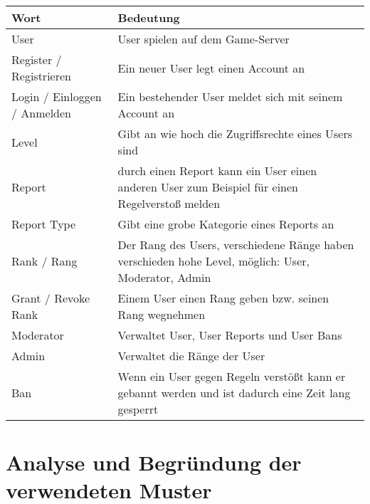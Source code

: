 \begin{center}
    \begin{tabular}{ | l | m{8cm} | }
        \hline
        Wort                         & Bedeutung                                                                                            \\ \hline
        User                         & User spielen auf dem Game-Server                                                                     \\ \hline
        Register / Registrieren      & Ein neuer User legt einen Account an                                                                 \\ \hline
        Login / Einloggen / Anmelden & Ein bestehender User meldet sich mit seinem Account an                                               \\ \hline
        Level                        & Gibt an wie hoch die Zugriffsrechte eines Users sind                                                 \\ \hline
        Report                       & durch einen Report kann ein User einen anderen User zum Beispiel für einen Regelverstoß melden       \\ \hline
        Report Type                  & Gibt eine grobe Kategorie eines Reports an                                                           \\ \hline
        Rank / Rang                  & Der Rang des Users, verschiedene Ränge haben verschieden hohe Level, möglich: User, Moderator, Admin \\ \hline
        Grant / Revoke Rank          & Einem User einen Rang geben bzw. seinen Rang wegnehmen                                               \\ \hline
        Moderator                    & Verwaltet User, User Reports und User Bans                                                           \\ \hline
        Admin                        & Verwaltet die Ränge der User                                                                         \\ \hline
        Ban                          & Wenn ein User gegen Regeln verstößt kann er gebannt werden und ist dadurch eine Zeit lang gesperrt   \\ \hline
    \end{tabular}
\end{center}


\section{Analyse und Begründung der verwendeten Muster}

